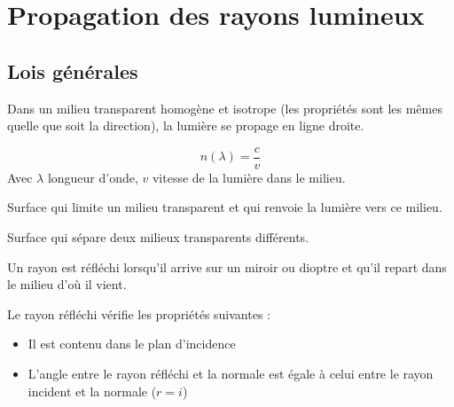 \documentclass[11pt]{article}
\theoremstyle{cstyle}{\newtheorem{definition}{Définition}[section]}
\theoremstyle{cstyle}{\newtheorem{proposition}[definition]{Propriété}}
\theoremstyle{cstyle}{\newtheorem{theorem}[definition]{Théorème}}
\theoremstyle{mystyle}{\newtheorem{lemma}[definition]{Lemme}}
\theoremstyle{mystyle}{\newtheorem{corollary}[definition]{Corollaire}}
\theoremstyle{mystyle}{\newtheorem*{remark}{Remarque}}
\theoremstyle{mystyle}{\newtheorem*{remarks}{Remarques}}
\theoremstyle{mystyle}{\newtheorem*{example}{Exemple}}
\theoremstyle{mystyle}{\newtheorem*{examples}{Exemples}}
\theoremstyle{definition}{\newtheorem*{exercise}{Exercice}}
\theoremstyle{mystyle}{\newtheorem*{methode}{Méthode}}
\theoremstyle{cstyle}{\newtheorem*{cthm}{}}
\theoremstyle{warn}
\begin{document}
	\vrule
	\hfill
	\begin{minipage}[t]{0.45\textwidth}
		\section{Propagation des rayons lumineux}
		
		\subsection{Lois générales}
		
		\begin{proposition}
			Dans un milieu transparent homogène et isotrope (les propriétés sont les mêmes quelle que soit la direction), la lumière se propage en ligne droite.
		\end{proposition}
	
		\begin{definition}
			\[ n(\lambda) = \frac{c}{v} \]
			Avec \(\lambda\) longueur d'onde, \(v\) vitesse de la lumière dans le milieu.
		\end{definition}
	
		\begin{definition}[Miroir]
			Surface qui limite un milieu transparent et qui renvoie la lumière vers ce milieu.
		\end{definition}
	
		\begin{definition}[Dioptre]
			Surface qui sépare deux milieux transparents différents.
		\end{definition}
	
		\begin{theorem}
			Un rayon est réfléchi lorsqu'il arrive sur un miroir ou dioptre et qu'il repart dans le milieu d'où il vient.
			
			Le rayon réfléchi vérifie les propriétés suivantes :
			\begin{itemize}
				\item Il est contenu dans le plan d'incidence
				\item L'angle entre le rayon réfléchi et la normale est égale à celui entre le rayon incident et la normale (\(r = i\))
			\end{itemize}
		\end{theorem}
	\end{minipage}

	

	\newpage
	
\end{document}
